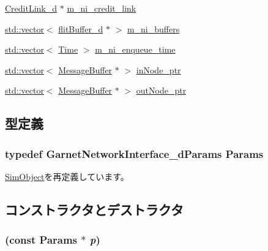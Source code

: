 \begin{DoxyCompactItemize}
\item 
\hyperlink{classCreditLink__d}{CreditLink\_\-d} $\ast$ \hyperlink{classNetworkInterface__d_a586e9d61fe6b52622d7589a756560ec6}{m\_\-ni\_\-credit\_\-link}
\item 
\hyperlink{classstd_1_1vector}{std::vector}$<$ \hyperlink{classflitBuffer__d}{flitBuffer\_\-d} $\ast$ $>$ \hyperlink{classNetworkInterface__d_a364f3f4326fe3dc25234b260deecf659}{m\_\-ni\_\-buffers}
\item 
\hyperlink{classstd_1_1vector}{std::vector}$<$ \hyperlink{classTime}{Time} $>$ \hyperlink{classNetworkInterface__d_a6dec698d5050bbeb09ab70f9ea7df75c}{m\_\-ni\_\-enqueue\_\-time}
\item 
\hyperlink{classstd_1_1vector}{std::vector}$<$ \hyperlink{classMessageBuffer}{MessageBuffer} $\ast$ $>$ \hyperlink{classNetworkInterface__d_a933eda70266204185e6bc2a65f0add98}{inNode\_\-ptr}
\item 
\hyperlink{classstd_1_1vector}{std::vector}$<$ \hyperlink{classMessageBuffer}{MessageBuffer} $\ast$ $>$ \hyperlink{classNetworkInterface__d_aff22e632df88a83fbcbac281efec0dcc}{outNode\_\-ptr}
\end{DoxyCompactItemize}


\subsection{型定義}
\hypertarget{classNetworkInterface__d_ab6c40ec3be0502fd09ea61583eecc26a}{
\subsubsection[{Params}]{\setlength{\rightskip}{0pt plus 5cm}typedef GarnetNetworkInterface\_\-dParams {\bf Params}}}
\label{classNetworkInterface__d_ab6c40ec3be0502fd09ea61583eecc26a}


\hyperlink{classSimObject_a0f0761d2db586a23bb2a2880b8f387bb}{SimObject}を再定義しています。

\subsection{コンストラクタとデストラクタ}
\hypertarget{classNetworkInterface__d_a1f5049c73c6c9b05ac58d9ec59df057c}{
\subsubsection[{NetworkInterface\_\-d}]{ (const {\bf Params} $\ast$ {\em p})}}
\label{classNetworkInterface__d_a1f5049c73c6c9b05ac58d9ec59df057c}



